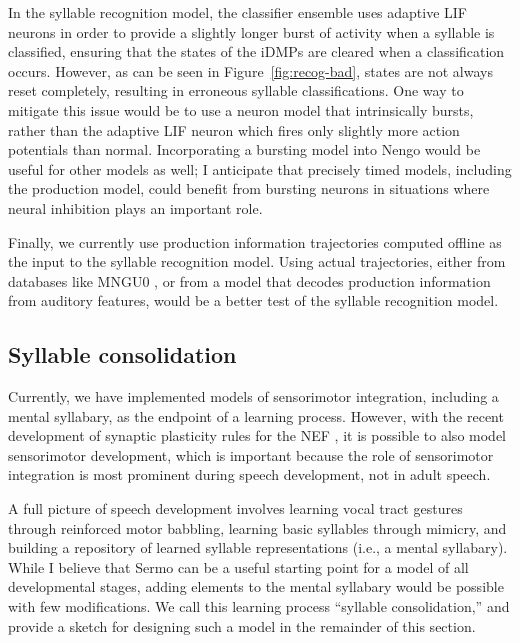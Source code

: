 In the syllable recognition model,
the classifier ensemble uses adaptive LIF neurons
in order to provide a slightly longer
burst of activity when a syllable is classified,
ensuring that the states
of the iDMPs are cleared
when a classification occurs.
However, as can be seen in Figure~\ref{fig:recog-bad},
states are not always reset completely,
resulting in erroneous syllable classifications.
One way to mitigate this issue
would be to use a neuron model
that intrinsically bursts,
rather than the adaptive LIF neuron
which fires only slightly more
action potentials than normal.
Incorporating a bursting model
into Nengo would be useful for other models as well;
I anticipate that precisely timed models,
including the production model,
could benefit from bursting neurons
in situations where neural inhibition
plays an important role.

Finally, we currently use
production information trajectories
computed offline as the input to
the syllable recognition model.
Using actual trajectories,
either from databases like
MNGU0 \citep{steiner2012},
or from a model that decodes
production information from
auditory features,
would be a better test
of the syllable recognition model.

\subsection{Syllable consolidation}
\label{sec:syllable-learning}

Currently, we have implemented models
of sensorimotor integration,
including a mental syllabary,
as the endpoint of a learning process.
However, with the recent development
of synaptic plasticity rules
for the NEF
\citep{macneil2011,bekolay2013a},
it is possible to also model
sensorimotor development,
which is important because
the role of sensorimotor integration
is most prominent during speech development,
not in adult speech.

A full picture of speech development involves
learning vocal tract gestures
through reinforced motor babbling,
learning basic syllables
through mimicry,
and building a repository of
learned syllable representations
(i.e., a mental syllabary).
While I believe that Sermo can be
a useful starting point for a
model of all developmental stages,
adding elements to the mental syllabary
would be possible with few modifications.
We call this learning process
``syllable consolidation,''
and provide a sketch for designing
such a model in the remainder of this section.

